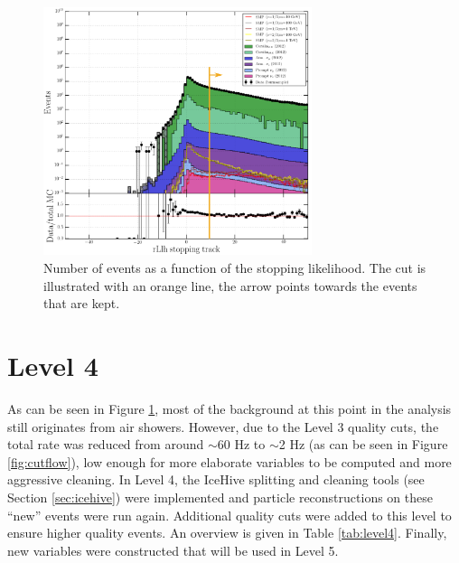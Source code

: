 \begin{figure}[t]
\centering
\includegraphics[width=0.7\textwidth]{chapter8/img/L3_zenithcut_gr_1p4835298642_rloglcut_less_15_npecut_less_50_startingtrackcut_hs_gr_0_1D_stack_finitereco_rllh_stopping_new.png}
\caption{Number of events as a function of the stopping likelihood. The cut is illustrated with an orange line, the arrow points towards the events that are kept.}
\label{fig:level3stopping}
\end{figure}

\section{Level 4}
As can be seen in Figure \ref{fig:level3stopping}, most of the background at this point in the analysis still originates from air showers. However, due to the Level 3 quality cuts, the total rate was reduced from around $\sim$60 Hz to $\sim$2 Hz (as can be seen in Figure \ref{fig:cutflow}), low enough for more elaborate variables to be computed and more aggressive cleaning. In Level 4, the IceHive splitting and cleaning tools (see Section \ref{sec:icehive}) were implemented and particle reconstructions on these ``new'' events were run again. Additional quality cuts were added to this level to ensure higher quality events. An overview is given in Table \ref{tab:level4}. Finally, new variables were constructed that will be used in Level 5.

